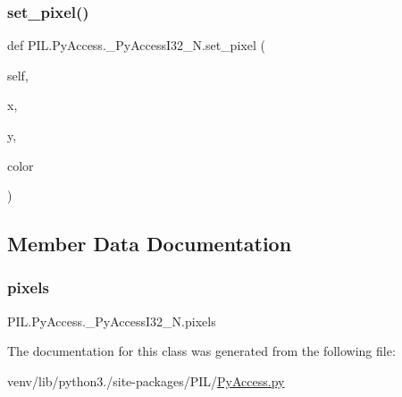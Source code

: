 \subsubsection{\texorpdfstring{set\+\_\+pixel()}{set\_pixel()}}
{\footnotesize\ttfamily def P\+I\+L.\+Py\+Access.\+\_\+\+Py\+Access\+I32\+\_\+\+N.\+set\+\_\+pixel (\begin{DoxyParamCaption}\item[{}]{self,  }\item[{}]{x,  }\item[{}]{y,  }\item[{}]{color }\end{DoxyParamCaption})}



\subsection{Member Data Documentation}
\mbox{\label{classPIL_1_1PyAccess_1_1__PyAccessI32__N_a882df7308aebe1eb40de9003e35241ed}} 
\subsubsection{\texorpdfstring{pixels}{pixels}}
{\footnotesize\ttfamily P\+I\+L.\+Py\+Access.\+\_\+\+Py\+Access\+I32\+\_\+\+N.\+pixels}



The documentation for this class was generated from the following file\+:\begin{DoxyCompactItemize}
\item 
venv/lib/python3./site-\/packages/\+P\+I\+L/\hyperlink{PyAccess_8py}{Py\+Access.\+py}\end{DoxyCompactItemize}
